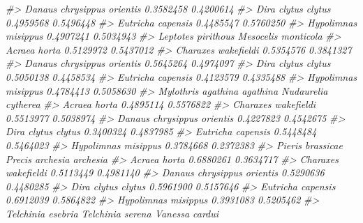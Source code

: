 \documentclass[
]{article}
\newenvironment{Shaded}{\begin{snugshade}}{\end{snugshade}}
\newcommand{\CommentTok}[1]{\textcolor[rgb]{0.56,0.35,0.01}{\textit{#1}}}
\begin{document}
\begin{Shaded}
\begin{Highlighting}[]
\CommentTok{\#\textgreater{} Danaus chrysippus orientis                 0.3582458             0.4200614}
\CommentTok{\#\textgreater{} Dira clytus clytus                         0.4959568             0.5496448}
\CommentTok{\#\textgreater{} Eutricha capensis                          0.4485547             0.5760250}
\CommentTok{\#\textgreater{} Hypolimnas misippus                        0.4907241             0.5034943}
\CommentTok{\#\textgreater{}                            Leptotes pirithous Mesocelis monticola}
\CommentTok{\#\textgreater{} Acraea horta                        0.5129972           0.5437012}
\CommentTok{\#\textgreater{} Charaxes wakefieldi                 0.5354576           0.3841327}
\CommentTok{\#\textgreater{} Danaus chrysippus orientis          0.5645264           0.4974097}
\CommentTok{\#\textgreater{} Dira clytus clytus                  0.5050138           0.4458534}
\CommentTok{\#\textgreater{} Eutricha capensis                   0.4123579           0.4335488}
\CommentTok{\#\textgreater{} Hypolimnas misippus                 0.4784413           0.5058630}
\CommentTok{\#\textgreater{}                            Mylothris agathina agathina Nudaurelia cytherea}
\CommentTok{\#\textgreater{} Acraea horta                                 0.4895114           0.5576822}
\CommentTok{\#\textgreater{} Charaxes wakefieldi                          0.5513977           0.5038974}
\CommentTok{\#\textgreater{} Danaus chrysippus orientis                   0.4227823           0.4542675}
\CommentTok{\#\textgreater{} Dira clytus clytus                           0.3400324           0.4837985}
\CommentTok{\#\textgreater{} Eutricha capensis                            0.5448484           0.5464023}
\CommentTok{\#\textgreater{} Hypolimnas misippus                          0.3784668           0.2372383}
\CommentTok{\#\textgreater{}                            Pieris brassicae Precis archesia archesia}
\CommentTok{\#\textgreater{} Acraea horta                      0.6880261                0.3634717}
\CommentTok{\#\textgreater{} Charaxes wakefieldi               0.5113449                0.4981140}
\CommentTok{\#\textgreater{} Danaus chrysippus orientis        0.5290636                0.4480285}
\CommentTok{\#\textgreater{} Dira clytus clytus                0.5961900                0.5157646}
\CommentTok{\#\textgreater{} Eutricha capensis                 0.6912039                0.5864822}
\CommentTok{\#\textgreater{} Hypolimnas misippus               0.3931083                0.5205462}
\CommentTok{\#\textgreater{}                            Telchinia esebria Telchinia serena Vanessa cardui}

\end{Highlighting}
\end{Shaded}
\end{document}
